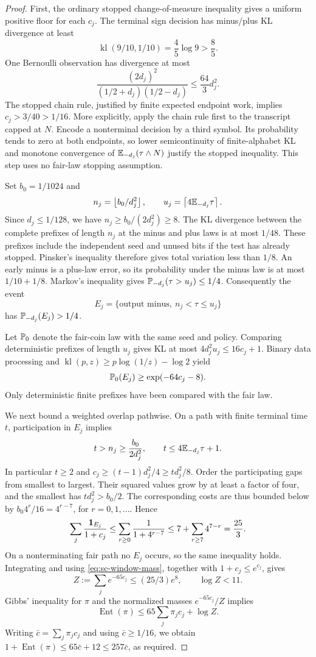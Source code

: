 \begin{proof}
First, the ordinary stopped change-of-measure inequality gives a uniform
positive floor for each $c_j$.  The terminal sign decision has minus/plus
KL divergence at least
\[
 \operatorname{kl}(9/10,1/10)=\frac45\log9>\frac85.
\]
One Bernoulli observation has divergence at most
\[
 \frac{(2d_j)^2}{(1/2+d_j)(1/2-d_j)}\le\frac{64}{3}d_j^2.
\]
The stopped chain rule, justified by finite expected endpoint work, implies
$c_j>3/40>1/16$. More explicitly, apply the chain rule first to
the transcript capped at $N$. Encode a nonterminal decision by a third
symbol. Its probability tends to zero at both endpoints, so lower
semicontinuity of finite-alphabet KL and monotone convergence of
$\mathbb E_{-d_j}(\tau\wedge N)$ justify the stopped inequality.
This step uses no fair-law stopping assumption.

Set $b_0=1/1024$ and
\[
 n_j=\left\lfloor b_0/d_j^2\right\rfloor,\qquad
 u_j=\left\lceil4\mathbb E_{-d_j}\tau\right\rceil.
\]
Since $d_j\le1/128$, we have $n_j\ge b_0/(2d_j^2)\ge8$.
The KL divergence between the complete prefixes of length $n_j$ at the
minus and plus laws is at most $1/48$.  These prefixes include the
independent seed and unused bits if the test has already stopped.
Pinsker's inequality therefore gives total variation less than $1/8$.
An early minus is a plus-law error, so its probability under the minus law
is at most $1/10+1/8$.  Markov's inequality gives
$\mathbb P_{-d_j}(\tau>u_j)\le1/4$.  Consequently the event
\[
 E_j=\{\text{output minus},\ n_j<\tau\le u_j\}
\]
has $\mathbb P_{-d_j}(E_j)>1/4$.

Let $\mathbb P_0$ denote the fair-coin law with the same seed and policy.
Comparing deterministic prefixes of length $u_j$ gives KL at most
$4d_j^2u_j\le16c_j+1$.  Binary data processing and
$\operatorname{kl}(p,z)\ge p\log(1/z)-\log2$ yield
\begin{equation}\label{eq:sc-window-mass}
 \mathbb P_0(E_j)\ge\exp(-64c_j-8).
\end{equation}
Only deterministic finite prefixes have been compared with the fair law.

We next bound a weighted overlap pathwise.  On a path with finite terminal
time $t$, participation in $E_j$ implies
\[
 t>n_j\ge\frac{b_0}{2d_j^2},\qquad
 t\le4\mathbb E_{-d_j}\tau+1.
\]
In particular $t\ge2$ and
$c_j\ge(t-1)d_j^2/4\ge td_j^2/8$.
Order the participating gaps from smallest to largest.  Their squared
values grow by at least a factor of four, and the smallest has
$td_j^2>b_0/2$.  The corresponding costs are thus bounded below by
$b_0 4^r/16=4^{r-7}$, for $r=0,1,\ldots$.  Hence
\[
 \sum_j\frac{\mathbf 1_{E_j}}{1+c_j}
 \le\sum_{r\ge0}\frac1{1+4^{r-7}}
 \le7+\sum_{r\ge7}4^{7-r}=\frac{25}{3}.
\]
On a nonterminating fair path no $E_j$ occurs, so the same inequality
holds.  Integrating and using \eqref{eq:sc-window-mass}, together with
$1+c_j\le e^{c_j}$, gives
\[
 Z:=\sum_je^{-65c_j}\le(25/3)e^8,
 \qquad \log Z<11.
\]
Gibbs' inequality for $\pi$ and the normalized masses $e^{-65c_j}/Z$
implies
\[
 \operatorname{Ent}(\pi)\le65\sum_j\pi_jc_j+\log Z.
\]
Writing $\bar c=\sum_j\pi_jc_j$ and using $\bar c\ge1/16$, we obtain
$1+\operatorname{Ent}(\pi)\le65\bar c+12\le257\bar c$, as required.
\end{proof}


